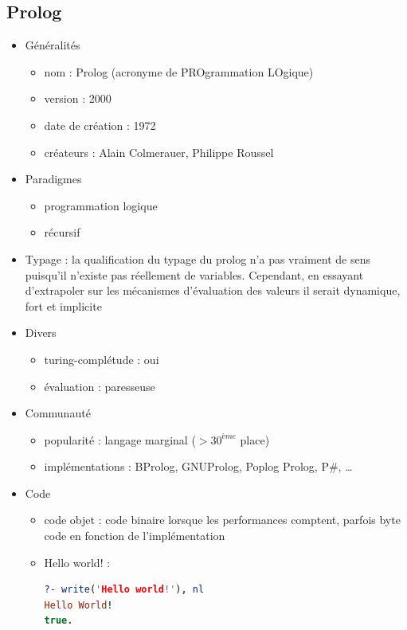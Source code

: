 \newpage

\subsection{Prolog}

\renewcommand{\labelitemi}{\textbullet}
\begin{itemize}
\item Généralités
	\begin{itemize}
	\item nom : Prolog (acronyme de PROgrammation LOgique)
	\item version : 2000
	\item date de création : 1972
	\item créateurs : Alain Colmerauer, Philippe Roussel\\
	\end{itemize}
\item Paradigmes
	\begin{itemize}
	\item programmation logique
	\item récursif\\
	\end{itemize}
\item Typage : la qualification du typage du prolog n'a pas vraiment de sens puisqu'il n'existe pas réellement de variables. Cependant, en essayant d'extrapoler sur les mécanismes d'évaluation des valeurs il serait dynamique, fort et implicite\\
\item Divers
	\begin{itemize}
	\item turing-complétude : oui
	\item évaluation : paresseuse\\
	\end{itemize}
\item Communauté
	\begin{itemize}
	\item popularité : langage marginal ($> 30^{ème}$ place)
	\item implémentations : BProlog, GNUProlog, Poplog Prolog, P\#, …\\
	\end{itemize}
\item Code
	\begin{itemize}
	\item code objet : code binaire lorsque les performances comptent, parfois byte code en fonction de l'implémentation
	\item Hello world! :
\begin{lstlisting}[language=prolog]
?- write('Hello world!'), nl
Hello World!
true.
\end{lstlisting}
	\end{itemize}
\end{itemize}

